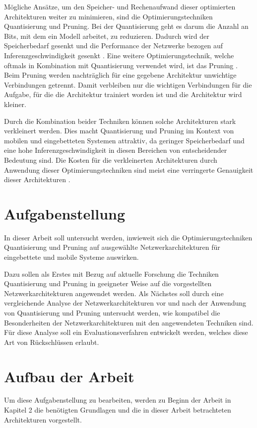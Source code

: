 Mögliche Ansätze, um den Speicher- und Rechenaufwand dieser optimierten Architekturen weiter zu minimieren, sind die Optimierungstechniken Quantisierung und Pruning. Bei der Quantisierung geht es darum die Anzahl an Bits, mit dem ein Modell arbeitet, zu reduzieren. Dadurch wird der Speicherbedarf gesenkt und die Performance der Netzwerke bezogen auf Inferenzgeschwindigkeit gesenkt \cite{jacob_quantization_2017}. Eine weitere Optimierungstechnik, welche oftmals in Kombination mit Quantisierung verwendet wird, ist das Pruning \cite{zhu_prune_2017}. Beim Pruning werden nachträglich für eine gegebene Architektur unwichtige Verbindungen getrennt. Damit verbleiben nur die wichtigen Verbindungen für die Aufgabe, für die die Architektur trainiert worden ist und die Architektur wird kleiner.

Durch die Kombination beider Techniken können solche Architekturen stark verkleinert werden. Dies macht Quantisierung und Pruning im Kontext von mobilen und eingebetteten Systemen attraktiv, da geringer Speicherbedarf und eine hohe Inferenzgeschwindigkeit in diesen Bereichen von entscheidender Bedeutung sind. Die Kosten für die verkleinerten Architekturen durch Anwendung dieser Optimierungstechniken sind meist eine verringerte Genauigkeit dieser Architekturen \cite{jacob_quantization_2017, zhu_prune_2017, hooker_what_2020}.

\section{Aufgabenstellung}
In dieser Arbeit soll untersucht werden, inwieweit sich die Optimierungstechniken Quantisierung und Pruning auf ausgewählte Netzwerkarchitekturen für eingebettete und mobile Systeme auswirken. 

Dazu sollen als Erstes mit Bezug auf aktuelle Forschung die Techniken Quantisierung und Pruning in geeigneter Weise auf die vorgestellten Netzwerkarchitekturen angewendet werden. Als Nächstes soll durch eine vergleichende Analyse der Netzwerkarchitekturen vor und nach der Anwendung von Quantisierung und Pruning untersucht werden, wie kompatibel die Besonderheiten der Netzwerkarchitekturen mit den angewendeten Techniken sind. Für diese Analyse soll ein Evaluationsverfahren entwickelt werden, welches diese Art von Rückschlüssen erlaubt.

\section{Aufbau der Arbeit}
Um diese Aufgabenstellung zu bearbeiten, werden zu Beginn der Arbeit in Kapitel 2 die benötigten Grundlagen und die in dieser Arbeit betrachteten Architekturen vorgestellt. 

